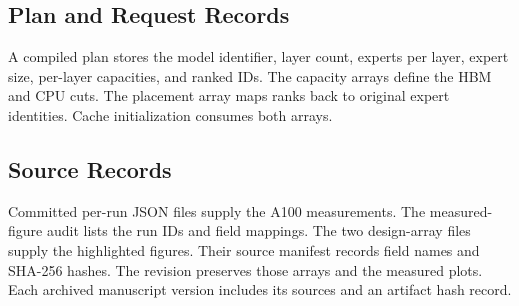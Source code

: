 \documentclass[conference,9pt,letterpaper]{IEEEtran}
\begin{document}
\subsection{Plan and Request Records}
A compiled plan stores the model identifier, layer count, experts per layer, expert size, per-layer capacities, and ranked IDs. The capacity arrays define the HBM and CPU cuts. The placement array maps ranks back to original expert identities. Cache initialization consumes both arrays.

\subsection{Source Records}
Committed per-run JSON files supply the A100 measurements. The measured-figure audit lists the run IDs and field mappings. The two design-array files supply the highlighted figures. Their source manifest records field names and SHA-256 hashes. The revision preserves those arrays and the measured plots. Each archived manuscript version includes its sources and an artifact hash record.
\end{document}
